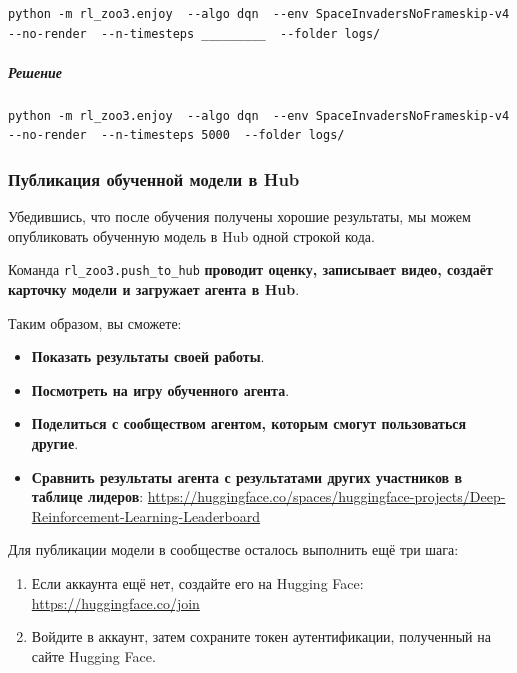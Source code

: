 \documentclass[11pt,a4paper]{article}
\begin{document}
\begin{lstlisting}
python -m rl_zoo3.enjoy  --algo dqn  --env SpaceInvadersNoFrameskip-v4  --no-render  --n-timesteps _________  --folder logs/
\end{lstlisting}

\subparagraph{Решение}\label{solution-1}

\begin{lstlisting}
python -m rl_zoo3.enjoy  --algo dqn  --env SpaceInvadersNoFrameskip-v4  --no-render  --n-timesteps 5000  --folder logs/
\end{lstlisting}

\subsubsection{Публикация обученной модели в Hub}\label{publish-our-trained-model-on-the-hub}

Убедившись, что после обучения получены хорошие результаты, мы можем опубликовать обученную модель в Hub одной строкой кода.


Команда \texttt{rl\_zoo3.push\_to\_hub} \textbf{проводит оценку, записывает видео, создаёт карточку модели и загружает агента в Hub}.

Таким образом, вы сможете:

\begin{itemize}
\tightlist
\item
\textbf{Показать результаты своей работы}.
\item
\textbf{Посмотреть на игру обученного агента}.
\item
\textbf{Поделиться с сообществом агентом, которым смогут пользоваться другие}.
\item
\textbf{Сравнить результаты агента с результатами других участников в таблице лидеров}: \url{https://huggingface.co/spaces/huggingface-projects/Deep-Reinforcement-Learning-Leaderboard}
\end{itemize}

Для публикации модели в сообществе осталось выполнить ещё три шага:

\begin{enumerate}
\def\labelenumi{\arabic{enumi}.}
\item
Если аккаунта ещё нет, создайте его на Hugging Face: \url{https://huggingface.co/join}
\item
Войдите в аккаунт, затем сохраните токен аутентификации, полученный на сайте Hugging Face.
\end{enumerate}
\end{document}
